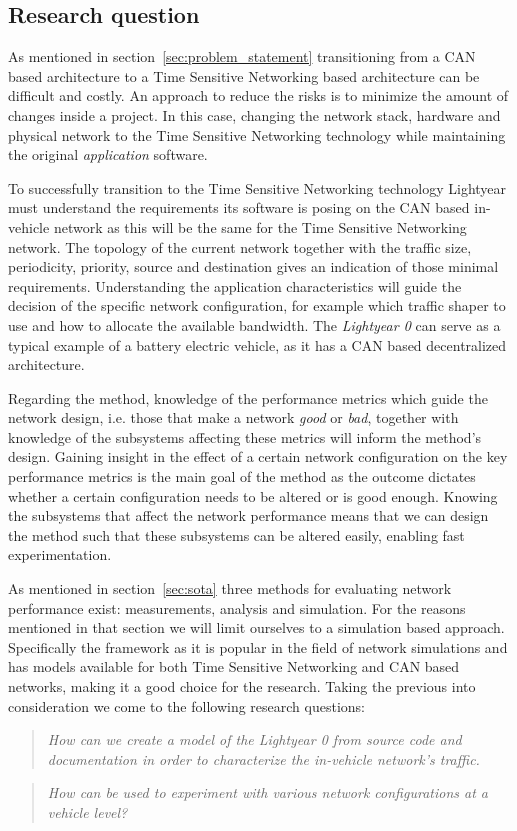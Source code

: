 \subsection{Research question}
\label{sec:research_question}
As mentioned in section~\ref{sec:problem_statement} transitioning from a CAN based architecture to a Time Sensitive Networking based architecture can be difficult and costly. An approach to reduce the risks is to minimize the amount of changes inside a project. In this case, changing the network stack, hardware and physical network to the Time Sensitive Networking technology while maintaining the original \textit{application} software.

To successfully transition to the Time Sensitive Networking technology Lightyear must understand the requirements its software is posing on the CAN based in-vehicle network as this will be the same for the Time Sensitive Networking network. The topology of the current network together with the traffic size, periodicity, priority, source and destination gives an indication of those minimal requirements. Understanding the application characteristics will guide the decision of the specific network configuration, for example which traffic shaper to use and how to allocate the available bandwidth. The \textit{Lightyear 0} can serve as a typical example of a battery electric vehicle, as it has a CAN based decentralized architecture.

Regarding the method, knowledge of the performance metrics which guide the network design, i.e. those that make a network \textit{good} or \textit{bad}, together with knowledge of the subsystems affecting these metrics will inform the method's design. Gaining insight in the effect of a certain network configuration on the key performance metrics is the main goal of the method as the outcome dictates whether a certain configuration needs to be altered or is good enough. Knowing the subsystems that affect the network performance means that we can design the method such that these subsystems can be altered easily, enabling fast experimentation.

As mentioned in section~\ref{sec:sota} three methods for evaluating network performance exist: measurements, analysis and simulation. For the reasons mentioned in that section we will limit ourselves to a simulation based approach. Specifically the \omnet framework as it is popular in the field of network simulations and has models available for both Time Sensitive Networking and CAN based networks, making it a good choice for the research. Taking the previous into consideration we come to the following research questions:

\begin{quote}
    \emph{How can we create a model of the Lightyear 0 from source code and documentation in order to characterize the in-vehicle network's traffic.}
\end{quote}

\begin{quote}
    \emph{How can \omnet be used to experiment with various network configurations at a vehicle level?}
\end{quote}